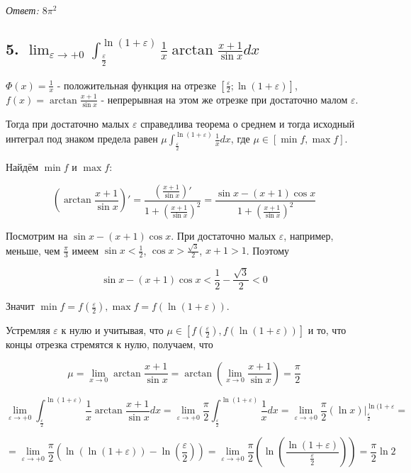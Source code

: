 \documentclass[a4paper]{article}
\begin{document}
\textit{Ответ: $8 \pi^2$}

\subsection*{5. $\displaystyle \lim_{\varepsilon \rightarrow +0} \int_{\frac{\varepsilon}{2}}^{\ln (1+\varepsilon)} \frac{1}{x} \arctan \frac{x+1}{\sin x} dx$}

$\Phi(x) =\frac{1}{x}$ - положительная функция на отрезке $[\frac{\varepsilon}{2}; \ln (1+\varepsilon)]$,
$f(x) = \arctan \frac{x+1}{\sin x}$ - непрерывная на этом же отрезке при достаточно малом $\varepsilon$.
 
Тогда при достаточно малых $\varepsilon$ справедлива теорема о среднем и тогда исходный интеграл под знаком предела равен $\mu \int_{\frac{\varepsilon}{2}}^{\ln (1+\varepsilon)} \frac{1}{x} dx$, где $\mu \in [\min f, \max f]$.

Найдём $\min f$ и $\max f$:

\[
\left( \arctan \frac{x+1}{\sin x} \right)' = \frac{\left(\frac{x+1}{\sin x}\right)'}{1+\left( \frac{x+1}{\sin x} \right)^2} =  \frac{\sin x - (x+1) \cos x}{1+\left( \frac{x+1}{\sin x} \right)^2}
\]

Посмотрим на $\sin x - (x+1) \cos x$. При достаточно малых $\varepsilon$, например, меньше, чем $\frac{\pi}{3}$ имеем $\sin x < \frac{1}{2}$, $\cos x > \frac{\sqrt{3}}{2}$, $x+1>1$.
Поэтому 

\[
\sin x - (x+1) \cos x < \frac{1}{2} - \frac{\sqrt{3}}{2} < 0
\]

Значит $\min f = f \left( \frac{\varepsilon}{2} \right), \max f = f \left( \ln (1+ \varepsilon) \right)$.

Устремляя $\varepsilon$ к нулю и учитывая, что $\mu \in \left[ f \left( \frac{\varepsilon}{2} \right), f \left( \ln (1+ \varepsilon) \right) \right]$ и то, что концы отрезка стремятся к нулю, получаем, что 

\[\mu = 
\lim_{x \rightarrow 0} \arctan \frac{x+1}{\sin x} = \arctan \left( \lim_{x \rightarrow 0} \frac{x+1}{\sin x} \right) = \frac{\pi}{2}\]

\[\displaystyle \lim_{\varepsilon \rightarrow +0} \int_{\frac{\varepsilon}{2}}^{\ln (1+\varepsilon)} \frac{1}{x} \arctan \frac{x+1}{\sin x} dx = \lim_{\varepsilon \rightarrow +0}  \frac{\pi}{2} \int_{\frac{\varepsilon}{2}}^{\ln (1+\varepsilon)} \frac{1}{x} dx = \lim_{\varepsilon \rightarrow +0} \frac{\pi}{2} \left( \ln x \right) \bigg|_{\frac{\varepsilon}{2}}^{\ln (1+\varepsilon} = 
\]

\[
= \lim_{\varepsilon \rightarrow +0} \frac{\pi}{2}\left( \ln \left( \ln (1+ \varepsilon) \right) - \ln \left( \frac{\varepsilon}{2} \right) \right) = \lim_{\varepsilon \rightarrow +0} \frac{\pi}{2}\left( \ln \left( \frac{\ln (1+\varepsilon)}{\frac{\varepsilon}{2}} \right) \right) = \frac{\pi}{2} \ln 2
\]
\end{document}
